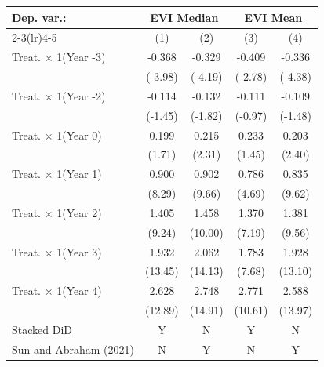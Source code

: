 \begin{tabular}{l*{4}{c}}
\toprule
Dep. var.: & \multicolumn{2}{c}{EVI Median} & \multicolumn{2}{c}{EVI Mean}  \\
\cmidrule(lr){2-3}\cmidrule(lr){4-5}
                &\multicolumn{1}{c}{(1)}         &\multicolumn{1}{c}{(2)}         &\multicolumn{1}{c}{(3)}         &\multicolumn{1}{c}{(4)}         \\
\midrule
Treat. $\times$ 1(Year -3)&   -0.368\sym{***}&   -0.329\sym{***}&   -0.409\sym{***}&   -0.336\sym{***}\\
                &  (-3.98)         &  (-4.19)         &  (-2.78)         &  (-4.38)         \\
Treat. $\times$ 1(Year -2)&   -0.114         &   -0.132\sym{*}  &   -0.111         &   -0.109         \\
                &  (-1.45)         &  (-1.82)         &  (-0.97)         &  (-1.48)         \\
Treat. $\times$ 1(Year 0)&    0.199\sym{*}  &    0.215\sym{**} &    0.233         &    0.203\sym{**} \\
                &   (1.71)         &   (2.31)         &   (1.45)         &   (2.40)         \\
Treat. $\times$ 1(Year 1)&    0.900\sym{***}&    0.902\sym{***}&    0.786\sym{***}&    0.835\sym{***}\\
                &   (8.29)         &   (9.66)         &   (4.69)         &   (9.62)         \\
Treat. $\times$ 1(Year 2)&    1.405\sym{***}&    1.458\sym{***}&    1.370\sym{***}&    1.381\sym{***}\\
                &   (9.24)         &  (10.00)         &   (7.19)         &   (9.56)         \\
Treat. $\times$ 1(Year 3)&    1.932\sym{***}&    2.062\sym{***}&    1.783\sym{***}&    1.928\sym{***}\\
                &  (13.45)         &  (14.13)         &   (7.68)         &  (13.10)         \\
Treat. $\times$ 1(Year 4)&    2.628\sym{***}&    2.748\sym{***}&    2.771\sym{***}&    2.588\sym{***}\\
                &  (12.89)         &  (14.91)         &  (10.61)         &  (13.97)         \\
\midrule
Stacked DiD     &        Y         &        N         &        Y         &        N         \\
Sun and Abraham (2021)&        N         &        Y         &        N         &        Y         \\

\end{tabular}
